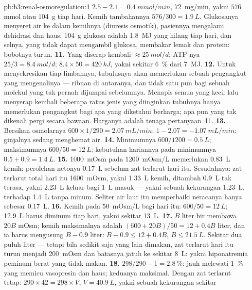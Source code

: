 \begin{solution}{pb:b3:renal-osmoregulation:1}
$2.5 - 2.1 = \qty{0.4}{mmol/min}$, \qty{72}{mg/min}, yakni $576$ mmol atau
\qty{104}{g} tiap hari. Kemih tambahannya $576/300 = \qty{1.9}{L}$. Glukosanya
menyeret air ke dalam kemihnya (diuresis osmotik), pasiennya mengalami dehidrasi
dan haus; \qty{104}{g} glukosa adalah \qty{1.8}{MJ} yang hilang tiap hari, dan
selnya, yang tidak dapat mengambil glukosa, membakar lemak dan protein: bobotnya
turun.
\textbf{11.} Yang diserap kembali $\approx \qty{25}{mol/d}$; ATP-nya $25/3 =
\qty{8.4}{mol/d}$; $8.4\times 50 = \qty{420}{kJ}$, yakni sekitar \qty{6}{\%}
dari \qty{7}{MJ}.
\textbf{12.} Untuk menyekresikan tiap limbahnya, tubulusnya akan memerlukan sebuah pengangkut
yang mengenalinya --- ribuan di antaranya, dan tidak satu pun bagi sebuah molekul yang tak pernah
dijumpai sebelumnya. Menapis semua yang kecil lalu menyerap kembali beberapa ratus
jenis yang diinginkan tubuhnya hanya memerlukan pengangkut bagi apa yang diketahui
berharga; apa pun yang tak dikenali pergi secara bawaan. Harganya adalah
tenaga pertanyaan~11.
\textbf{13.} Bersihan osmolarnya $600\times 1/290 = \qty{2.07}{mL/min}$;
 $1 - 2.07 = -\qty{1.07}{mL/min}$: ginjalnya sedang
menghemat air.
\textbf{14.} Minimumnya $600/1200 = \qty{0.5}{L}$; maksimumnya $600/50 =
\qty{12}{L}$; kebutuhan hariannya pada minimumnya $0.5 + 0.9 = \qty{1.4}{L}$.
\textbf{15.} \qty{1000}{mOsm} pada \qty{1200}{mOsm/L} memerlukan
\qty{0.83}{L} kemih: perolehan netonya \qty{0.17}{L} sebelum zat terlarut hari itu.
Sesudahnya: zat terlarut total hari itu \qty{1600}{mOsm}, yakni \qty{1.33}{L}
kemih, ditambah \qty{0.9}{L} tak terasa, yakni \qty{2.23}{L} keluar bagi \qty{1}{L}
masuk --- yakni sebuah kekurangan \qty{1.23}{L}, terhadap \qty{1.4}{L} tanpa minum.
Seliter air laut itu memperbaiki neracanya hanya sebesar \qty{0.17}{L}.
\textbf{16.} Kemih pada \qty{50}{mOsm/L} bagi hari itu: $600/50 =
\qty{12}{L}$; \qty{12.9}{L} harus diminum tiap hari, yakni sekitar \qty{13}{L}.
\textbf{17.} $B$ liter bir membawa $20B$ mOsm; kemih maksimalnya adalah
$(600 + 20B)/50 = 12 + 0.4B$ liter, dan ia harus mengusung $B - 0.9$
liter: $B - 0.9 \le 12 + 0.4B$, $B \le \qty{21.5}{L}$. Sekitar dua puluh
liter --- tetapi bila sedikit saja yang lain dimakan, zat terlarut hari itu turun menjadi
\qty{200}{mOsm} dan batasnya jatuh ke sekitar \qty{8}{L}: yakni
hiponatremia peminum berat yang tidak makan.
\textbf{18.} $298/290 - 1 = \qty{2.8}{\%}$: jauh melewati \qty{1}{\%} yang
memicu vasopresin dan haus; keduanya maksimal. Dengan zat terlarut tetap:
$290\times 42 = 298\times V$, $V = \qty{40.9}{L}$, yakni sebuah kekurangan sekitar

\end{solution}
